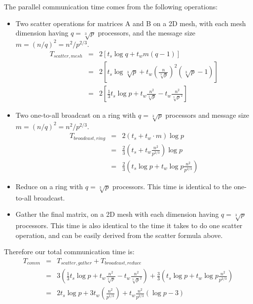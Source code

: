 \documentclass{article}
\begin{document}
The parallel communication time comes from the following operations:
\begin{itemize}
  \item Two scatter operations for matrices A and B on a 2D mesh, with each mesh dimension having $q = \sqrt[3]{p}$ processors, 
  and the message size $m = (n/q)^2 = n^2/p^{2/3}$.
	\begin{eqnarray*}
  			T_{{scatter},{mesh}} &=& 2 \left[ t_s \log{q} + t_w  m (q-1) \right] \\
  								 &=& 2 \left[ t_s \log{\sqrt[3]{p}} + t_w \left( \frac{n}{\sqrt[3]{p}} \right)^2 (\sqrt[3]{p} - 1) \right] \\
   								 &=& 2 \left[ \frac{1}{3} t_s  \log{p} + t_w  \frac{n^2}{\sqrt[3]{p}} - t_w \frac{n^2}{\sqrt[3]{p}^2}  \right]		 
  	\end{eqnarray*}
  \item Two one-to-all broadcast on a ring with $q = \sqrt[3]{p}$ processors and message size $m = (n/q)^2 = n^2/p^{2/3}$.
  	\begin{eqnarray*}
  		 T_{{broadcast},{ring}} &=& 2 (t_s + t_w\cdot m) \log{p} \\
  		 						&=& \frac{2}{3} \left(t_s + t_w \frac{n^2}{p^{2/3}}\right) \log{p} \\
  		 						&=& \frac{2}{3} \left( t_s \log{p} + t_w \log{p} \frac{n^2}{p^{2/3}} \right)
  	\end{eqnarray*}
  \item Reduce on a ring with $q = \sqrt[3]{p}$ processors.  This time is identical to the one-to-all broadcast.
  \item Gather the final matrix, on a 2D mesh with each dimension having $q = \sqrt[3]{p}$ processors.  This time is also identical 
  to the time it takes to do one scatter operation, and can be easily derived from the scatter formula above.
\end{itemize}

Therefore our total communication time is:
\begin{eqnarray*}
T_{{comm}} &=& T_{{scatter},{gather}} + T_{{broadcast},{reduce}} \\
		   &=& 3 \left( \frac{1}{3} t_s  \log{p} + t_w  \frac{n^2}{\sqrt[3]{p}} - t_w \frac{n^2}{\sqrt[3]{p}^2}  \right) +
		     \frac{3}{3} \left( t_s \log{p} + t_w \log{p} \frac{n^2}{p^{2/3}} \right) \\
		   &=& 2 t_s \log{p} + 3 t_w \left( \frac{n^2}{{p}^{1/3}} \right) + t_w \frac{n^2}{p^{2/3}} (\log{p} - 3)
\end{eqnarray*}
\end{document}

